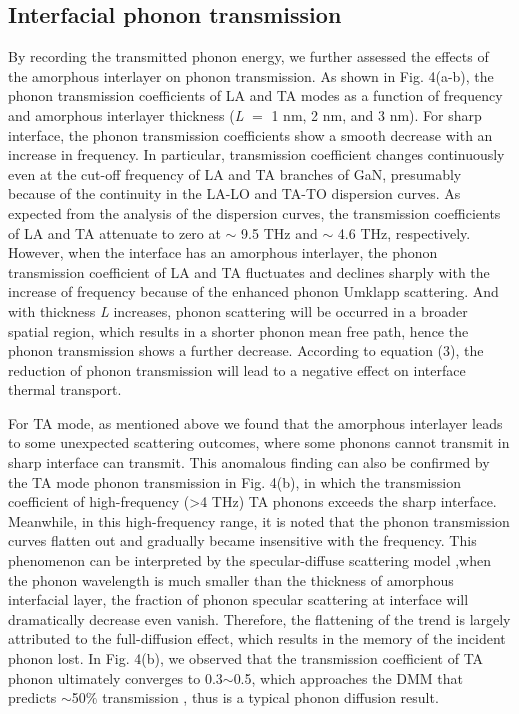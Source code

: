 \documentclass{article}
\begin{document}
\subsection{Interfacial phonon transmission}

By recording the transmitted phonon energy, we further assessed the effects of the amorphous interlayer on phonon transmission. As shown in Fig. 4(a-b), the phonon transmission coefficients of LA and TA modes as a function of frequency and amorphous interlayer thickness (\textit{L }$=$ 1 nm, 2 nm, and 3 nm). For sharp interface, the phonon transmission coefficients show a smooth decrease with an increase in frequency. In particular, transmission coefficient changes continuously even at the cut-off frequency of LA and TA branches of GaN, presumably because of the continuity in the LA-LO and TA-TO dispersion curves. As expected from the analysis of the dispersion curves, the transmission coefficients of LA and TA attenuate to zero at $\sim$ 9.5 THz and $\sim$ 4.6 THz, respectively. However, when the interface has an amorphous interlayer, the phonon transmission coefficient of LA and TA fluctuates and declines sharply with the increase of frequency because of the enhanced phonon Umklapp scattering. And with thickness \textit{L} increases, phonon scattering will be occurred in a broader spatial region, which results in a shorter phonon mean free path, hence the phonon transmission shows a further decrease. According to equation (3), the reduction of phonon transmission will lead to a negative effect on interface thermal transport. 

For TA mode, as mentioned above we found that the amorphous interlayer leads to some unexpected scattering outcomes, where some phonons cannot transmit in sharp interface can transmit. This anomalous finding can also be confirmed by the TA mode phonon transmission in Fig. 4(b), in which the transmission coefficient of high-frequency (>4 THz) TA phonons exceeds the sharp interface. Meanwhile, in this high-frequency range, it is noted that the phonon transmission curves flatten out and gradually became insensitive with the frequency. This phenomenon can be interpreted by the specular-diffuse scattering model  \cite{shao2018understanding},when the phonon wavelength is much  smaller than the thickness of amorphous interfacial layer, the fraction of phonon specular scattering at interface will dramatically decrease even vanish. Therefore, the flattening of the trend is largely attributed to the full-diffusion effect, which results in the memory of the incident phonon lost. In Fig. 4(b), we observed that the transmission coefficient of TA phonon ultimately converges to 0.3$\sim$0.5, which approaches the DMM that predicts $\sim$50$\%$ transmission  \cite{majumdar2004role}, thus is a typical phonon diffusion result.
\end{document}
